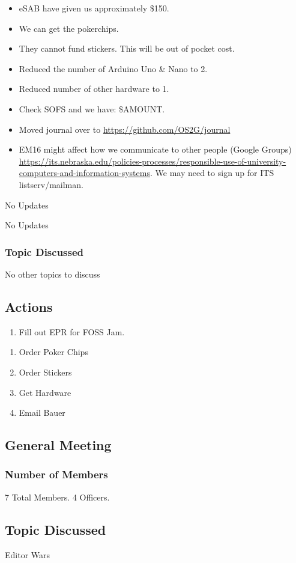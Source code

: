 \begin{itemize}
    \item eSAB have given us approximately \$150. 
    \item We can get the pokerchips.
    \item They cannot fund stickers. This will be out of pocket cost.
    \item Reduced the number of Arduino Uno \& Nano to 2.
    \item Reduced number of other hardware to 1.
    \item Check SOFS and we have: \$AMOUNT.
    \item Moved journal over to \href{https://github.com/OS2G/journal}{https://github.com/OS2G/journal}
    \item EM16 might affect how we communicate to other people (Google Groups) \href{https://its.nebraska.edu/policies-processes/responsible-use-of-university-computers-and-information-systems}{https://its.nebraska.edu/policies-processes/responsible-use-of-university-computers-and-information-systems}.
    We may need to sign up for ITS listserv/mailman.
\end{itemize}

\textbf{\primaryprogrammer}

No Updates

\textbf{\secretary}

No Updates

\subsubsection{Topic Discussed}

No other topics to discuss

\subsection{Actions}

\textbf{\primaryprogrammer}

\begin{enumerate}
    \item Fill out EPR for FOSS Jam.
\end{enumerate}

\textbf{\tresurer}

\begin{enumerate}
    \item Order Poker Chips
    \item Order Stickers
    \item Get Hardware
    \item Email Bauer
\end{enumerate}

\subsection{General Meeting}
\subsubsection{Number of Members} 

7 Total Members. 4 Officers.

\subsection{Topic Discussed}
Editor Wars